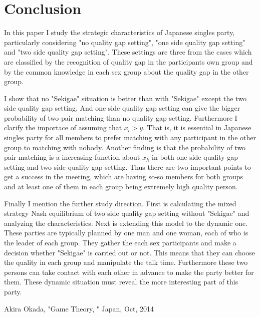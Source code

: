 \documentclass{article}
\begin{document}
\section{Conclusion}
\par
In this paper I study the strategic characteristics of Japanese singles party, particularly considering "no quality gap setting", "one side quality gap setting" and "two side quality gap setting". These settings are three from the cases which are classified by the recognition of quality gap in the participants own group and by the common knowledge in each sex group about the quality gap in the other group. 
\par
I show that no "Sekigae" situation is better than with "Sekigae" except the two side quality gap setting. And one side quality gap setting can give the bigger probability of two pair matching than no quality gap setting. Furthermore I clarify the importace of assuming that $x_l > y$. That is, it is essential in Japanese singles party for all members to prefer matching with any participant in the other group to matching with nobody.
Another finding is that the probability of two pair matching is a increasing function about $x_h$ in both one side quality gap setting and two side quality gap setting.
Thus there are two important points to get a success in the meeting, which are having so-so members for both groups and at least one of them in each group being extremely high quality person.
\par
Finally I mention the further study direction. First is calculating the mixed strategy Nash equilibrium of two side quality gap setting without "Sekigae" and analyzing the characteristics. Next is extending this model to the dynamic one. These parties are typically planned by one man and one woman, each of who is the leader of each group. They gather the each sex participants and make a decision whether "Sekigae" is carried out or not. This means that they can choose the quality in each group and manipulate the talk time. Furthermore these two persons can take contact with each other in advance to make the party better for them. These dynamic situation must reveal the more interesting part of this party.

\begin{thebibliography}{9}
 Akira Okada, "Game Theory, " Japan, Oct, 2014
\end{thebibliography}
\end{document}
